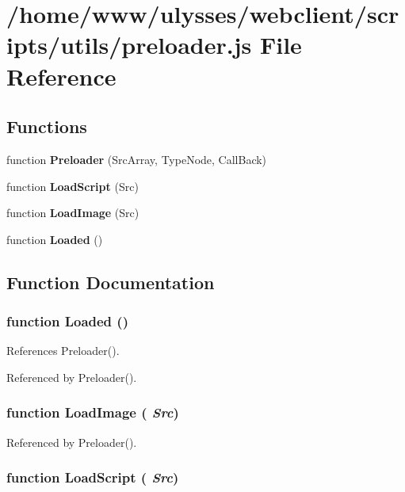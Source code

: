 \section{/home/www/ulysses/webclient/scripts/utils/preloader.js File Reference}
\label{preloader_8js}
\subsection*{Functions}
\begin{CompactItemize}
\item 
function {\bf Preloader} (SrcArray, TypeNode, CallBack)
\item 
function {\bf LoadScript} (Src)
\item 
function {\bf LoadImage} (Src)
\item 
function {\bf Loaded} ()
\end{CompactItemize}


\subsection{Function Documentation}
\subsubsection{\setlength{\rightskip}{0pt plus 5cm}function Loaded ()}\label{preloader_8js_c2e16a7074f55248167ba9149c9093f9}




References Preloader().

Referenced by Preloader().
\subsubsection{\setlength{\rightskip}{0pt plus 5cm}function LoadImage ( {\em Src})}\label{preloader_8js_d472cf669afdd857de582a9115ace4da}




Referenced by Preloader().
\subsubsection{\setlength{\rightskip}{0pt plus 5cm}function LoadScript ( {\em Src})}\label{preloader_8js_2ae845600fa117e02c062500654ec863}




